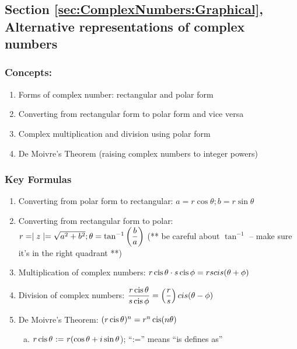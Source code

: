 \subsection*{Section \ref{sec:ComplexNumbers:Graphical}, Alternative representations of complex numbers}
\subsubsection*{Concepts:}
\begin{enumerate}
\item 
Forms of complex number: rectangular and polar form
\item
Converting from rectangular form to polar form and vice versa
\item
Complex multiplication and division using polar form
\item
De Moivre's Theorem (raising complex numbers to integer powers)
\end{enumerate}

\subsubsection*{Key Formulas}
\begin{enumerate}
\item 
Converting from polar form to rectangular: $a = r\cos\theta; b = r\sin\theta$
\item 
Converting from rectangular form to polar: $r = \mid z \mid = \sqrt{a^{2}+b^{2}}; \\\theta = \tan^{-1}\left(\dfrac{b}{a}\right)$ (** be careful about $\tan^{-1}$ -- make sure it's in the right quadrant **)    
\item 
Multiplication of complex numbers: $r \operatorname{cis} \theta \cdot s \operatorname{cis} \phi = rscis(\theta + \phi)$ 
\item 
Division of complex numbers: $\dfrac{r \operatorname{cis} \theta}{s \operatorname{cis} \phi} = \left(\dfrac{r}{s}\right)cis(\theta - \phi)$
\item 
De Moivre's Theorem: $(r \operatorname{cis} \theta)^{n} = r^{n}\operatorname{cis}(n \theta)$

\begin{enumerate}[(a)]
\item
$r \operatorname{cis} \theta \text{ := } r(\cos\theta +  i\sin\theta$); ``:='' means ``is defines as''
\end{enumerate}
\end{enumerate}

